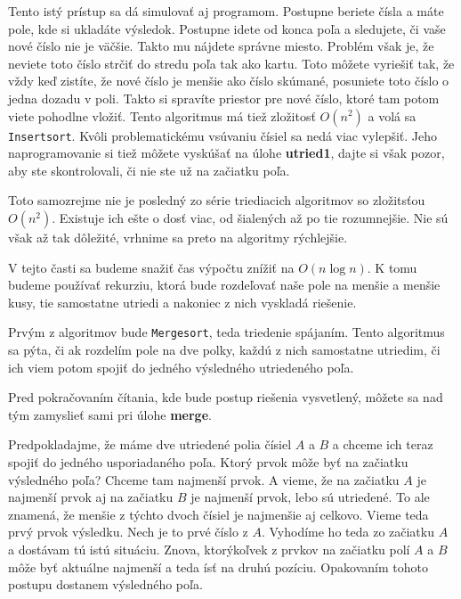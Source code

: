 Tento istý prístup sa dá simulovať aj programom. Postupne beriete čísla a máte pole, kde si ukladáte
výsledok. Postupne idete od konca poľa a sledujete, či vaše nové číslo nie je väčšie. Takto mu
nájdete správne miesto. Problém však je, že neviete toto číslo strčiť do stredu poľa tak ako kartu.
Toto môžete vyriešiť tak, že vždy keď zistíte, že nové číslo je menšie ako číslo skúmané, posuniete
toto číslo o jedna dozadu v poli. Takto si spravíte priestor pre nové číslo, ktoré tam potom viete
pohodlne vložiť. Tento algoritmus má tiež zložitosť $O(n^2)$ a volá sa \texttt{Insertsort}. Kvôli 
problematickému vsúvaniu čísiel sa nedá viac vylepšiť. Jeho naprogramovanie si tiež môžete vyskúšať
na úlohe \textbf{utried1}, dajte si však pozor, aby ste skontrolovali, či nie ste už na začiatku poľa.

Toto samozrejme nie je posledný zo série triediacich algoritmov so zložitsťou $O(n^2)$. Existuje ich
ešte o dosť viac, od šialených až po tie rozumnejšie. Nie sú však až tak dôležité, vrhnime sa preto
na algoritmy rýchlejšie.


V tejto časti sa budeme snažiť čas výpočtu znížiť na $O(n\log n)$. K tomu budeme používať rekurziu,
ktorá bude rozdeľovať naše pole na menšie a menšie kusy, tie samostatne utriedi a nakoniec z nich
vyskladá riešenie.

Prvým z algoritmov bude \texttt{Mergesort}, teda triedenie spájaním. Tento algoritmus sa pýta, či ak
rozdelím pole na dve polky, každú z nich samostatne utriedim, či ich viem potom spojiť do jedného
výsledného utriedeného poľa.

\medskip

Pred pokračovaním čítania, kde bude postup riešenia vysvetlený, môžete sa nad tým zamyslieť sami pri
úlohe \textbf{merge}.

\medskip

Predpokladajme, že máme dve utriedené polia čísiel $A$ a $B$ a chceme ich teraz spojiť do jedného
usporiadaného poľa. Ktorý prvok môže byť na začiatku výsledného poľa? Chceme tam najmenší prvok. A
vieme, že na začiatku $A$ je najmenší prvok aj na začiatku $B$ je najmenší prvok, lebo sú utriedené.
To ale znamená, že menšie z týchto dvoch čísiel je najmenšie aj celkovo. Vieme teda prvý prvok
výsledku. Nech je to prvé číslo z $A$. Vyhodíme ho teda zo začiatku $A$ a dostávam tú istú situáciu.
Znova, ktorýkoľvek z prvkov na začiatku polí $A$ a $B$ môže byť aktuálne najmenší a teda ísť na
druhú pozíciu. Opakovaním tohoto postupu dostanem výsledného poľa.

